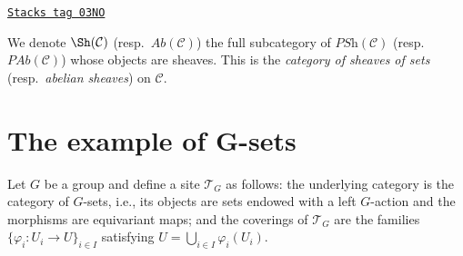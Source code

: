 \begin{definition}
\label{etale-cohomology-definition-category-sheaves}
\href{https://stacks.math.columbia.edu/tag/03NO}{\texttt{Stacks tag 03NO}}

We denote $\Sh(\mathcal{C})$ (resp.\ $\textit{Ab}(\mathcal{C})$)
the full subcategory of $\textit{PSh}(\mathcal{C})$
(resp.\ $\textit{PAb}(\mathcal{C})$) whose objects are sheaves. This is the
{\it category of sheaves of sets} (resp.\ {\it abelian sheaves}) on
$\mathcal{C}$.
\end{definition}

\section{The example of G-sets}
\label{etale-cohomology-section-G-sets}
Let $G$ be a group and define a site $\mathcal{T}_G$ as follows: the underlying
category is the category of $G$-sets, i.e., its objects are sets endowed
with a left $G$-action and the morphisms are equivariant maps; and the
coverings of $\mathcal{T}_G$ are the families
$\{\varphi_i : U_i \to U\}_{i\in I}$ satisfying
$U = \bigcup_{i\in I} \varphi_i(U_i)$.

